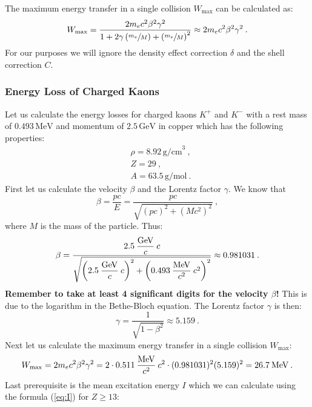 \documentclass[10pt, titlepage, a4paper]{article}
\numberwithin{equation}{section}
\begin{document}
The maximum energy transfer in a single collision $W_{\text{max}}$ can be calculated as:
%
\begin{equation}
    W_{\text{max}} = \frac{2m_e c^2\beta^2\gamma^2}{1 + 2\gamma \left(\sfrac{m_e}{M}\right) + \left(\sfrac{m_e}{M}\right)^2}\approx 2m_ec^2\beta^2\gamma^2\>.
    \label{eq:wmax}
\end{equation}
%
For our purposes we will ignore the density effect correction $\delta$ and the shell correction $C$.

\subsubsection{Energy Loss of Charged Kaons}
Let us calculate the energy losses for charged kaons $K^+$ and $K^-$ with a rest mass of $0.493\,\text{MeV}$ and momentum of $2.5\,\text{GeV}$ in copper which has the
following properties:
%
\begin{align*}
    & \rho = 8.92\,\text{g/cm}^3\>, \\
    & Z = 29\>, \\
    & A = 63.5\,\text{g/mol}\>.
\end{align*}
%
First let us calculate the velocity $\beta$ and the Lorentz factor $\gamma$. We know that
%
\begin{equation}
    \beta = \frac{pc}{E} = \frac{pc}{\sqrt{(pc)^2 + (Mc^2)^2}}\>,
\end{equation}
%
where $M$ is the mass of the particle. Thus:
%
\begin{equation}
    \beta = \frac{2.5\>\dfrac{\rm{GeV}}{c}\>c}{\sqrt{\left(2.5\>\dfrac{\rm{GeV}}{c}\>c\right)^2 + {\left(0.493\>\dfrac{\rm{MeV}}{c^2}\>c^2\right)}^2}} \approx 0.981031\>.
\end{equation}
%
\textbf{Remember to take at least 4 significant digits for the velocity $\beta$!} This is due to the logarithm in the Bethe-Bloch equation.
The Lorentz factor $\gamma$ is then:
%
\begin{equation}
    \gamma = \frac{1}{\sqrt{1-\beta^2}} \approx 5.159\>.
\end{equation}
%
Next let us calculate the maximum energy transfer in a single collision $W_{\text{max}}$:
%
\begin{equation}
    W_{\text{max}} = 2m_ec^2\beta^2\gamma^2 = 2\cdot 0.511\>\frac{\rm{MeV}}{c^2}\>c^2\cdot(0.981031)^2(5.159)^2 = 26.7\>\text{MeV}\>.
\end{equation}
%
Last prerequisite is the mean excitation energy $I$ which we can calculate using the formula (\ref{eq:I}) for $Z \geq 13$:
\end{document}

